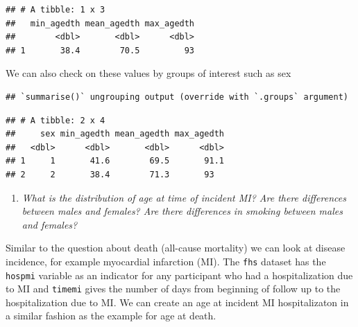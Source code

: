 \documentclass[
]{book}
\newenvironment{Shaded}{\begin{snugshade}}{\end{snugshade}}
\newcommand{\DataTypeTok}[1]{\textcolor[rgb]{0.13,0.29,0.53}{#1}}
\newcommand{\FloatTok}[1]{\textcolor[rgb]{0.00,0.00,0.81}{#1}}
\newcommand{\KeywordTok}[1]{\textcolor[rgb]{0.13,0.29,0.53}{\textbf{#1}}}
\newcommand{\NormalTok}[1]{#1}
\newcommand{\OperatorTok}[1]{\textcolor[rgb]{0.81,0.36,0.00}{\textbf{#1}}}
\newcommand{\StringTok}[1]{\textcolor[rgb]{0.31,0.60,0.02}{#1}}
\providecommand{\tightlist}{%
  \setlength{\itemsep}{0pt}\setlength{\parskip}{0pt}}
\begin{document}
\begin{verbatim}
## # A tibble: 1 x 3
##   min_agedth mean_agedth max_agedth
##        <dbl>       <dbl>      <dbl>
## 1       38.4        70.5         93
\end{verbatim}

We can also check on these values by groups of interest such as sex

\begin{Shaded}
\end{Shaded}

\begin{verbatim}
## `summarise()` ungrouping output (override with `.groups` argument)
\end{verbatim}

\begin{verbatim}
## # A tibble: 2 x 4
##     sex min_agedth mean_agedth max_agedth
##   <dbl>      <dbl>       <dbl>      <dbl>
## 1     1       41.6        69.5       91.1
## 2     2       38.4        71.3       93
\end{verbatim}

\begin{enumerate}
\def\labelenumi{\arabic{enumi}.}
\setcounter{enumi}{3}
\tightlist
\item
  \emph{What is the distribution of age at time of incident MI? Are there differences between males and females? Are there differences in smoking between males and females?}
\end{enumerate}

Similar to the question about death (all-cause mortality) we can look at disease incidence, for example myocardial infarction (MI). The \texttt{fhs} dataset has the \texttt{hospmi} variable as an indicator for any participant who had a hospitalization due to MI and \texttt{timemi} gives the number of days from beginning of follow up to the hospitalization due to MI. We can create an age at incident MI hospitalizaton in a similar fashion as the example for age at death.

\begin{Shaded}
\end{Shaded}
\end{document}
